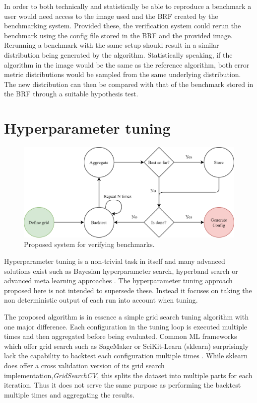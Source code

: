 In order to both technically and statistically be able to reproduce a benchmark a user would need access to the image used and the BRF created by the benchmarking system. Provided these, the verification system could rerun the benchmark using the config file stored in the BRF and the provided image. Rerunning a benchmark with the same setup should result in a similar distribution being generated by the algorithm. Statistically speaking, if the algorithm in the image would be the same as the reference algorithm, both error metric distributions would be sampled from the same underlying distribution. The new distribution can then be compared with that of the benchmark stored in the BRF through a suitable hypothesis test.

\section{Hyperparameter tuning}
\begin{figure}[h]
  \centering
  \includegraphics[width=\linewidth]{./img/tuning_overview.png}
  \caption{Proposed system for verifying benchmarks.}
  \label{fig:proposed_hyperparameter_tuning}
\end{figure}
Hyperparameter tuning is a non-trivial task in itself and many advanced solutions exist such as Bayesian hyperparameter search, hyperband search or advanced meta learning approaches \cite{snoek2012practical,feurer2019hyperparameter, li2017hyperband}. The hyperparameter tuning approach proposed here is not intended to supersede these. Instead it focuses on taking the non deterministic output of each run into account when tuning.

The proposed algorithm is in essence a simple grid search tuning algorithm with one major difference. Each configuration in the tuning loop is executed multiple times and then aggregated before being evaluated. Common ML frameworks which offer grid search such as SageMaker or SciKit-Learn (sklearn) surprisingly lack the capability to backtest each configuration multiple times \cite{sagemaker_website, scikit-learn}. While sklearn does offer a cross validation version of its grid search implementation,\textit{GridSearchCV}, this splits the dataset into multiple parts for each iteration. Thus it does not serve the same purpose as performing the backtest multiple times and aggregating the results.

